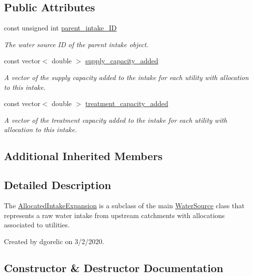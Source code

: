 \subsection*{Public Attributes}
\begin{DoxyCompactItemize}
\item 
const unsigned int \mbox{\hyperlink{classAllocatedIntakeExpansion_a725ce7276ef9158da9fa7e2b1e217b14}{parent\+\_\+intake\+\_\+\+ID}}
\begin{DoxyCompactList}\small\item\em The water source ID of the parent intake object. \end{DoxyCompactList}\item 
const vector$<$ double $>$ \mbox{\hyperlink{classAllocatedIntakeExpansion_ad788b8373f3e8c9eb2a910c370e91f7c}{supply\+\_\+capacity\+\_\+added}}
\begin{DoxyCompactList}\small\item\em A vector of the supply capacity added to the intake for each utility with allocation to this intake. \end{DoxyCompactList}\item 
const vector$<$ double $>$ \mbox{\hyperlink{classAllocatedIntakeExpansion_a22f6d50982db1cf862e81672612abdb9}{treatment\+\_\+capacity\+\_\+added}}
\begin{DoxyCompactList}\small\item\em A vector of the treatment capacity added to the intake for each utility with allocation to this intake. \end{DoxyCompactList}\end{DoxyCompactItemize}
\subsection*{Additional Inherited Members}


\subsection{Detailed Description}
The {\ttfamily \mbox{\hyperlink{classAllocatedIntakeExpansion}{Allocated\+Intake\+Expansion}}} is a subclass of the main {\ttfamily \mbox{\hyperlink{classWaterSource}{Water\+Source}}} class that represents a raw water intake from upstream catchments with allocations associated to utilities. 

Created by dgorelic on 3/2/2020. 

\subsection{Constructor \& Destructor Documentation}
\mbox{\label{classAllocatedIntakeExpansion_a4ed3330e33441d67d3b0c8bbb243d6c2}} 
